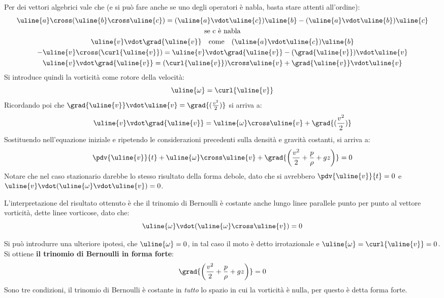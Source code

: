 Per dei vettori algebrici vale che (e si può fare anche se uno degli operatori è nabla, basta stare attenti all'ordine):
%
	\begin{equation*}
		\begin{gathered}
			\uline{a} \cross (\uline{b} \cross \uline{c}) = (\uline{a} \vdot \uline{c}) \uline{b} - (\uline{a} \vdot \uline{b}) \uline{c}\\
			\text{se c è nabla}\\
			\uline{v} \vdot \grad{\uline{v}} \quad \text{come} \quad (\uline{a} \vdot \uline{c}) \uline{b}\\
			- \uline{v} \cross (\curl{\uline{v}}) = \uline{v} \vdot \grad{\uline{v}} - (\grad{\uline{v}}) \vdot \uline{v}\\
			\uline{v} \vdot \grad{\uline{v}} = (\curl{\uline{v}}) \cross \uline{v} + \grad{\uline{v}} \vdot \uline{v}
		\end{gathered}
	\end{equation*}
%
Si introduce quindi la vorticità come rotore della velocità:
%
	\begin{equation*}
 		\uline{\omega} = \curl{\uline{v}}
	\end{equation*}
%
Ricordando poi che $\grad{\uline{v}} \vdot \uline{v} = \grad{ ( \frac{v^2}{2} ) }$ si arriva a:
%
	\begin{equation*}
		\uline{v} \vdot \grad{\uline{v}} = \uline{\omega} \cross \uline{v} + \grad{(\frac{v^2}{2})}
	\end{equation*}
%
Sostituendo nell'equazione iniziale e ripetendo le considerazioni precedenti sulla densità e gravità costanti, si arriva a:
%
	\begin{equation*}
		\pdv{\uline{v}}{t} + \uline{\omega} \cross \uline{v} + \grad{\left( \frac{v^2}{2} + \frac{p}{\rho} + gz \right)} = 0
	\end{equation*}
%
Notare che nel caso stazionario darebbe lo stesso risultato della forma debole, dato che si avrebbero $\pdv{\uline{v}}{t} = 0$ e $\uline{v} \vdot (\uline{\omega} \vdot \uline{v}) = 0$.

L'interpretazione del risultato ottenuto è che il trinomio di Bernoulli è costante anche lungo linee parallele punto per punto al vettore vorticità, dette linee vorticose, dato che:
%
	\begin{equation*}
		 \uline{\omega} \vdot (\uline{\omega} \cross \uline{v}) = 0
	\end{equation*}
%

Si può introdurre una ulteriore ipotesi, che $\uline{\omega} = 0$, in tal caso il moto è detto irrotazionale e $\uline{\omega} = \curl{\uline{v}} = 0$.
Si ottiene \textbf{il trinomio di Bernoulli in forma forte}:
%
	\begin{equation*}
		\grad{\left( \frac{v^2}{2} + \frac{p}{\rho} + gz \right)} = 0
	\end{equation*}
%
Sono tre condizioni, il trinomio di Bernoulli è costante in \textit{tutto} lo spazio in cui la vorticità è nulla, per questo è detta forma forte.

